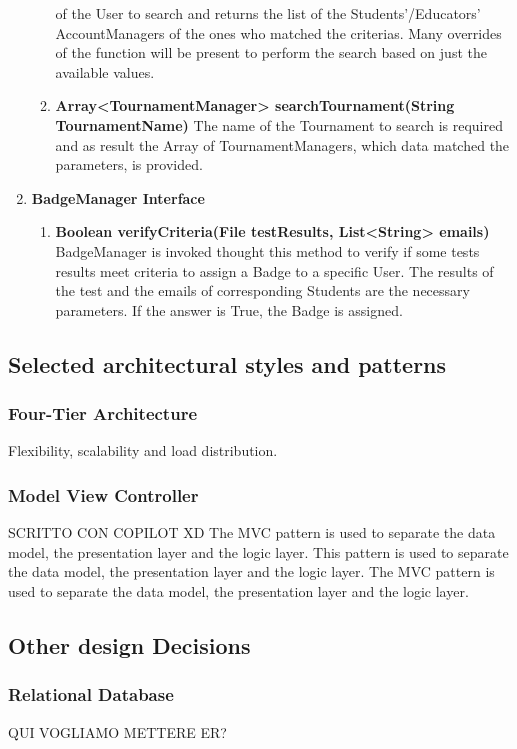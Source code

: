 \begin{enumerate}
\begin{enumerate}[label=$\bullet$]
            of the User to search and returns the list of the Students'/Educators' AccountManagers of the ones who matched the criterias. Many overrides of the function will be present to perform the search based on just the available values.
            \item \textbf{Array<TournamentManager> searchTournament(String TournamentName)} The name of the Tournament to search is required and as result the Array of TournamentManagers, which data matched the parameters, is provided.
        \end{enumerate}
    \item \textbf{BadgeManager Interface}
        \begin{enumerate}[label=$\bullet$]
            \item \textbf{Boolean verifyCriteria(File testResults, List<String> emails)} BadgeManager is invoked thought this method to verify if some tests results meet criteria to assign a Badge to a specific User. The results of 
            the test and the emails of corresponding Students are the necessary parameters. If the answer is True, the Badge is assigned.
        \end{enumerate}
\end{enumerate}

\subsection{Selected architectural styles and patterns}
\subsubsection{Four-Tier Architecture}
Flexibility, scalability and load distribution.
\subsubsection{Model View Controller}
SCRITTO CON COPILOT XD
The MVC pattern is used to separate the data model, the presentation layer and the logic layer. This pattern is used to separate the data model, the presentation layer and the logic layer. The MVC pattern is used to separate the data model, the presentation layer and the logic layer.
\subsection{Other design Decisions}
\subsubsection{Relational Database}
QUI VOGLIAMO METTERE ER?
